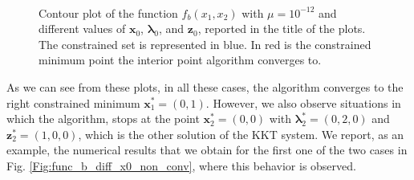 \documentclass[a4paper,11pt]{article}
\begin{document}
\begin{figure}[H]
	 \
	\caption{Contour plot of the function $f_{b}(x_{1},x_{2})$ with $\mu=10^{-12}$ and different values of $\textbf{x}_{0}$, $\boldsymbol{\lambda}_{0}$, and $\textbf{z}_{0}$, reported in the title of the plots. The constrained set is represented in blue. In red is the constrained minimum point the interior point algorithm converges to.}
	\label{Fig:func_b_diff_x0}
\end{figure}
\noindent As we can see from these plots, in all these cases, the algorithm converges to the right constrained minimum $\textbf{x}_{1}^*=(0,1)$. However, we also observe situations in which the algorithm, stops at the point $\textbf{x}_{2}^*=(0,0)$ with $\boldsymbol{\lambda}_{2}^*=(0,2,0)$ and $\textbf{z}_{2}^*=(1,0,0)$, which is the other solution of the KKT system. We report, as an example, the numerical results that we obtain for the first one of the two cases in Fig. \ref{Fig:func_b_diff_x0_non_conv}, where this behavior is observed.
\end{document}

